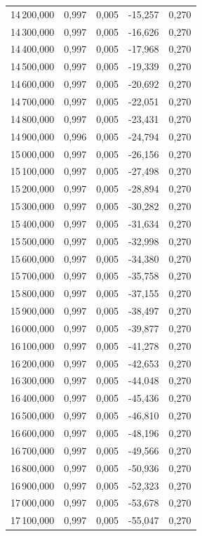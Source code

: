 \begin{longtable}{rrrrr}
14\,200,000 & 0,997 & 0,005 & -15,257 & 0,270\\
14\,300,000 & 0,997 & 0,005 & -16,626 & 0,270\\
14\,400,000 & 0,997 & 0,005 & -17,968 & 0,270\\
14\,500,000 & 0,997 & 0,005 & -19,339 & 0,270\\
14\,600,000 & 0,997 & 0,005 & -20,692 & 0,270\\
14\,700,000 & 0,997 & 0,005 & -22,051 & 0,270\\
14\,800,000 & 0,997 & 0,005 & -23,431 & 0,270\\
14\,900,000 & 0,996 & 0,005 & -24,794 & 0,270\\
15\,000,000 & 0,997 & 0,005 & -26,156 & 0,270\\
15\,100,000 & 0,997 & 0,005 & -27,498 & 0,270\\
15\,200,000 & 0,997 & 0,005 & -28,894 & 0,270\\
15\,300,000 & 0,997 & 0,005 & -30,282 & 0,270\\
15\,400,000 & 0,997 & 0,005 & -31,634 & 0,270\\
15\,500,000 & 0,997 & 0,005 & -32,998 & 0,270\\
15\,600,000 & 0,997 & 0,005 & -34,380 & 0,270\\
15\,700,000 & 0,997 & 0,005 & -35,758 & 0,270\\
15\,800,000 & 0,997 & 0,005 & -37,155 & 0,270\\
15\,900,000 & 0,997 & 0,005 & -38,497 & 0,270\\
16\,000,000 & 0,997 & 0,005 & -39,877 & 0,270\\
16\,100,000 & 0,997 & 0,005 & -41,278 & 0,270\\
16\,200,000 & 0,997 & 0,005 & -42,653 & 0,270\\
16\,300,000 & 0,997 & 0,005 & -44,048 & 0,270\\
16\,400,000 & 0,997 & 0,005 & -45,436 & 0,270\\
16\,500,000 & 0,997 & 0,005 & -46,810 & 0,270\\
16\,600,000 & 0,997 & 0,005 & -48,196 & 0,270\\
16\,700,000 & 0,997 & 0,005 & -49,566 & 0,270\\
16\,800,000 & 0,997 & 0,005 & -50,936 & 0,270\\
16\,900,000 & 0,997 & 0,005 & -52,323 & 0,270\\
17\,000,000 & 0,997 & 0,005 & -53,678 & 0,270\\
17\,100,000 & 0,997 & 0,005 & -55,047 & 0,270\\

\end{longtable}
